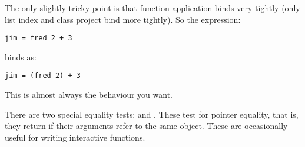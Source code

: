 The only slightly tricky point is that function application binds very
tightly (only list index and class project bind more tightly). So the
expression:

\begin{verbatim}
jim = fred 2 + 3
\end{verbatim}

\noindent
binds as:

\begin{verbatim}
jim = (fred 2) + 3
\end{verbatim}

\noindent
This is almost always the behaviour you want.

There are two special equality tests: \ct{===} and 
\ct{!==}. These test for pointer equality, that is, they return  if
their arguments refer to the same object. These are occasionally useful for
writing interactive functions.

